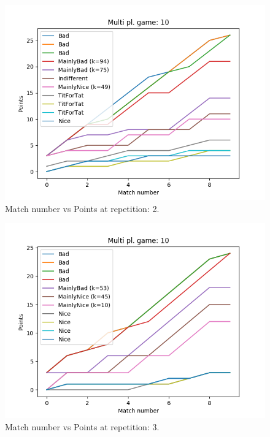 \documentclass[journal,a4paper,10pt,twoside]{IEEEtran}
\begin{document}
\begin{figure}
    \centering
    \includegraphics[width=1\columnwidth]{../img_v1/ridpmp-scores-10-r1.png}
    \caption{Match number vs Points at repetition: 2.}
    \label{fig:rmpipd2}
\end{figure}

\begin{figure}
    \centering
    \includegraphics[width=1\columnwidth]{../img_v1/ridpmp-scores-10-r2.png}
    \caption{Match number vs Points at repetition: 3.}
    \label{fig:rmpipd3}
\end{figure}
\end{document}
